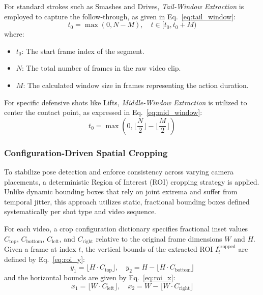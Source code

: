 \documentclass[pdflatex,sn-mathphys-num]{sn-jnl}
\theoremstyle{thmstyleone}%
\theoremstyle{thmstyletwo}%
\theoremstyle{thmstylethree}%
\begin{document}
For standard strokes such as Smashes and Drives, \textit{Tail-Window Extraction} is employed to capture the follow-through, as given in Eq.~\eqref{eq:tail_window}:
\begin{equation}
t_{0} = \max(0, N-M), \quad t \in [t_{0}, t_{0}+M)
\label{eq:tail_window}
\end{equation}
\noindent where:
\begin{itemize}
    \item $t_0$: The start frame index of the segment.
    \item $N$: The total number of frames in the raw video clip.
    \item $M$: The calculated window size in frames representing the action duration.
\end{itemize}

For specific defensive shots like Lifts, \textit{Middle-Window Extraction} is utilized to center the contact point, as expressed in Eq.~\eqref{eq:mid_window}:
\begin{equation}
t_{0} = \max(0, \lfloor \frac{N}{2} \rfloor - \lfloor \frac{M}{2} \rfloor)
\label{eq:mid_window}
\end{equation}

\subsubsection{Configuration-Driven Spatial Cropping}
To stabilize pose detection and enforce consistency across varying camera placements, a deterministic Region of Interest (ROI) cropping strategy is applied. Unlike dynamic bounding boxes that rely on joint extrema and suffer from temporal jitter, this approach utilizes static, fractional bounding boxes defined systematically per shot type and video sequence.

For each video, a crop configuration dictionary specifies fractional inset values $C_{\text{top}}$, $C_{\text{bottom}}$, $C_{\text{left}}$, and $C_{\text{right}}$ relative to the original frame dimensions $W$ and $H$. Given a frame at index $t$, the vertical bounds of the extracted ROI $I_t^{\text{cropped}}$ are defined by Eq.~\eqref{eq:roi_y}:
\begin{equation}
y_1 = \lfloor H \cdot C_{\text{top}} \rfloor, \quad y_2 = H - \lfloor H \cdot C_{\text{bottom}} \rfloor
\label{eq:roi_y}
\end{equation}
and the horizontal bounds are given by Eq.~\eqref{eq:roi_x}:
\begin{equation}
x_1 = \lfloor W \cdot C_{\text{left}} \rfloor, \quad x_2 = W - \lfloor W \cdot C_{\text{right}} \rfloor
\label{eq:roi_x}
\end{equation}
\end{document}
